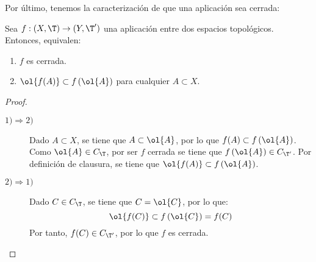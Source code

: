 Por último, tenemos la caracterización de que una aplicación sea cerrada:
\begin{prop}
    Sea $f:(X,\T)\to (Y,\T')$ una aplicación entre dos espacios topológicos. Entonces, equivalen:
    \begin{enumerate}
        \item $f$ es cerrada.
        \item $\ol{f(A)}\subset f\left(\ol{A}\right)$ para cualquier $A\subset X$.
    \end{enumerate}
\end{prop}
\begin{proof}~
    \begin{description}
        \item[$1) \Longrightarrow 2)$] Dado $A\subset X$, se tiene que $A\subset \ol{A}$, por lo que $f(A)\subset f\left(\ol{A}\right)$. Como $\ol{A}\in C_{\T}$, por ser $f$ cerrada se tiene que $f\left(\ol{A}\right)\in C_{\T'}$. Por definición de clausura, se tiene que $\ol{f(A)}\subset f\left(\ol{A}\right)$.
        
        \item[$2) \Longrightarrow 1)$] Dado $C\in C_\T$, se tiene que $C=\ol{C}$, por lo que:
        \begin{equation*}
           \ol{f(C)}\subset f\left(\ol{C}\right)=f(C)
        \end{equation*}
        Por tanto, $f(C)\in C_{\T'}$, por lo que $f$ es cerrada.
    \end{description}
\end{proof}


